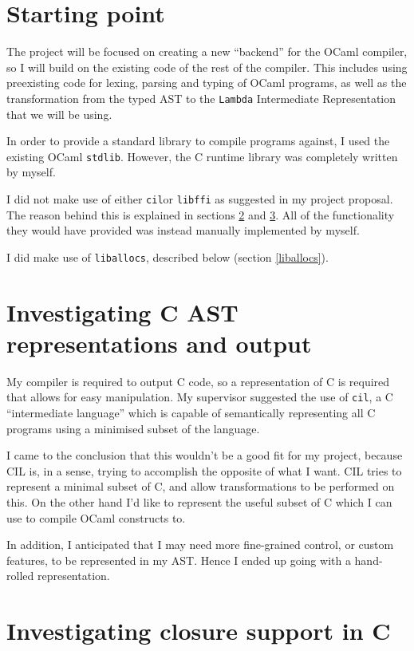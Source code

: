 \documentclass[12pt,a4paper,twoside,openright]{report}
\begin{document}
\section{Starting point}

The project will be focused on creating a new ``backend'' for the OCaml
compiler, so I will build on the existing code of the rest of the compiler.
This includes using preexisting code for lexing, parsing and typing of OCaml programs, as
well as the transformation from the typed AST to the \lstinline!Lambda! Intermediate
Representation that we will be using.

In order to provide a standard library to compile programs against, I used
the existing OCaml \lstinline{stdlib}. However, the C runtime
library was completely written by myself.

I did not make use of either \lstinline{cil}or \lstinline{libffi} as suggested
in my project proposal. The reason behind this is explained in sections
\ref{investigating-c-ast} and \ref{investigating-closure}. All of the
functionality they would have provided was instead manually implemented by
myself.

I did make use of \lstinline!liballocs!, described below (section \ref{liballocs}).

\section{Investigating C AST representations and output}\label{investigating-c-ast}

My compiler is required to output C code, so a representation of C
is required that allows for easy manipulation. My supervisor suggested the
use of \lstinline!cil!, a C ``intermediate language'' which is capable of
semantically representing all C programs using a minimised subset of the language.

I came to the conclusion that this wouldn't be a good fit for my project, because
 CIL is, in a sense, trying to accomplish the opposite of what I want. CIL
 tries to represent a minimal subset of C, and allow transformations to be
 performed on this. On the other hand I'd like to represent the useful subset
 of C which I can use to compile OCaml constructs to.

In addition, I anticipated that I may need more fine-grained control, or custom
features, to be represented in my AST. Hence I ended up going with a hand-rolled
representation.


\section{Investigating closure support in C}\label{investigating-closure}
\end{document}

